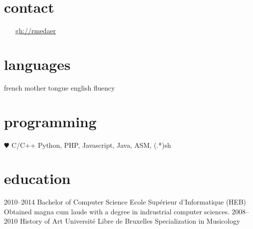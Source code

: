\documentclass[]{friggeri-cv} %
\begin{document}




\begin{aside} %
\section{contact}
\myAddress
~
\myPhoneNumber
~
\href{mailto:\myPrivateMail}{\ul{\myPrivateMail}}
\href{http://github.com/rmedaer}{\ul{gh://rmedaer}}
\section{languages}
french mother tongue
english fluency
\section{programming}
{\color{red} $\varheartsuit$} C/C++
Python, PHP, Javascript,
Java, ASM, (.*)sh
\end{aside}


\section{education}

\begin{entrylist}
\entry
{2010--2014}
{Bachelor {\normalfont of Computer Science}}
{Ecole Supérieur d'Informatique (HEB)}
{Obtained magna cum laude with a degree in indrustrial computer sciences.}
\entry
{2008--2010}
{{\normalfont History of Art}}
{Université Libre de Bruxelles}
{Specialization in Musicology}
\end{entrylist}

\end{document}
